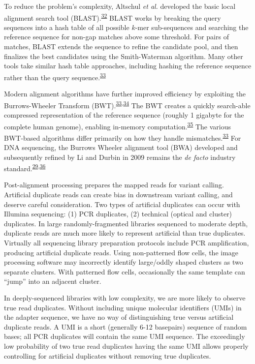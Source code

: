 \documentclass[11pt,letterpaper,oneside]{book}
\begin{document}
To reduce the problem's complexity, Altschul \emph{et al.} developed the basic local alignment search tool (BLAST).\textsuperscript{\protect\hyperlink{ref-altschul:1990aa}{32}}
BLAST works by breaking the query sequences into a hash table of all possible \(k\)-mer sub-sequences and searching the reference sequence for non-gap matches above some threshold.
For pairs of matches, BLAST extends the sequence to refine the candidate pool, and then finalizes the best candidates using the Smith-Waterman algorithm.
Many other tools take similar hash table approaches, including hashing the reference sequence rather than the query sequence.\textsuperscript{\protect\hyperlink{ref-li:2010aa}{33}}

Modern alignment algorithms have further improved efficiency by exploiting the Burrows-Wheeler Transform (BWT).\textsuperscript{\protect\hyperlink{ref-li:2010aa}{33},\protect\hyperlink{ref-burrows:1994aa}{34}}
The BWT creates a quickly search-able compressed representation of the reference sequence (roughly 1 gigabyte for the complete human genome), enabling in-memory computation.\textsuperscript{\protect\hyperlink{ref-lam:2008aa}{35}}
The various BWT-based algorithms differ primarily on how they handle mismatches.\textsuperscript{\protect\hyperlink{ref-li:2010aa}{33}}
For DNA sequencing, the Burrows Wheeler alignment tool (BWA) developed and subsequently refined by Li and Durbin in 2009 remains the \emph{de facto} industry standard.\textsuperscript{\protect\hyperlink{ref-li:2009aa}{29},\protect\hyperlink{ref-li:2010ab}{36}}

Post-alignment processing prepares the mapped reads for variant calling.
Artificial duplicate reads can create bias in downstream variant calling, and deserve careful consideration.
Two types of artificial duplicates can occur with Illumina sequencing: (1) PCR duplicates, (2) technical (optical and cluster) duplicates.
In large randomly-fragmented libraries sequenced to moderate depth, duplicate reads are much more likely to represent artificial than true duplicates.
Virtually all sequencing library preparation protocols include PCR amplification, producing artificial duplicate reads.
Using non-patterned flow cells, the image processing software may incorrectly identify large/oddly shaped clusters as two separate clusters.
With patterned flow cells, occasionally the same template can ``jump'' into an adjacent cluster.

In deeply-sequenced libraries with low complexity, we are more likely to observe true read duplicates.
Without including unique molecular identifiers (UMIs) in the adapter sequence, we have no way of distinguishing true versus artificial duplicate reads.
A UMI is a short (generally 6-12 basepairs) sequence of random bases; all PCR duplicates will contain the same UMI sequence.
The exceedingly low probability of two true read duplicates having the same UMI allows properly controlling for artificial duplicates without removing true duplicates.
\end{document}
